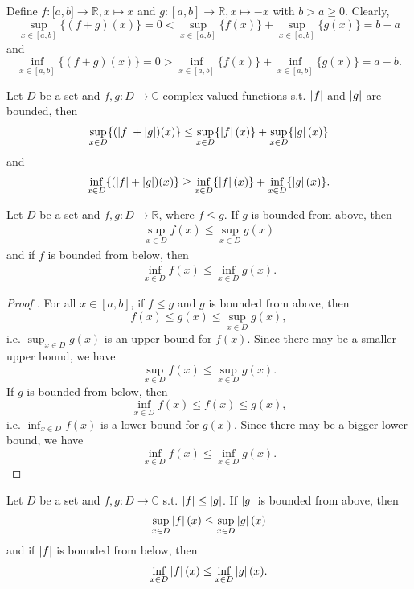 \begin{exmp}
	Define $f: \mathbb [a, b]\to\mathbb R, x\mapsto x$ and $g: [a, b]\to\mathbb R, x\mapsto -x$ with $b > a\geq 0$. Clearly, $$\sup_{x\in [a, b]}\{(f+g)(x)\} = 0 < \sup_{x\in [a, b]}\{f(x)\} + \sup_{x\in [a, b]}\{g(x)\} = b - a$$ and $$\inf_{x\in [a, b]}\{(f + g)(x)\} = 0 > \inf_{x\in [a, b]}\{f(x)\} + \inf_{x\in [a, b]}\{g(x)\} = a - b.$$
\end{exmp}

\begin{corollary}
	Let $D$ be a set and $f, g: D\to \mathbb C$ complex-valued functions s.t. $\left\vert f \right\vert$ and $\left\vert g \right\vert$ are bounded, then 
	\begin{align}
		\sup_{x\in D}\{(\left\vert f \right\vert + \left\vert g \right\vert)(x)\} \leq \sup_{x\in D}\{\left\vert f \right\vert(x)\} + \sup_{x\in D}\{\left\vert g \right\vert(x)\}
	\end{align}
	and
	\begin{align}
		\inf_{x\in D}\{(\left\vert f \right\vert+\left\vert g \right\vert)(x)\} \geq \inf_{x\in D}\{\left\vert f \right\vert(x)\} + \inf_{x\in D}\{\left\vert g \right\vert(x)\}.
	\end{align}
\end{corollary}

\begin{theorem}\label{thrm:sup_inequality_2}
	Let $D$ be a set and $f, g: D\to\mathbb R$, where $f \leq g$. If $g$ is bounded from above, then 
	\begin{align}\label{eq:sup_inequality_2}
		\sup_{x\in D}f(x)\leq \sup_{x\in D}g(x)
	\end{align}
	and if $f$ is bounded from below, then 
	\begin{align}
		\inf_{x\in D}f(x) \leq \inf_{x\in D}g(x).
	\end{align}
\end{theorem}

\begin{proof}[Proof \cite{src:supremum_and_infimum}]
	For all $x\in[a, b]$, if $f\leq g$ and $g$ is bounded from above, then
	$$f(x)\leq g(x)\leq \sup_{x\in D}g(x),$$
	i.e. $\sup_{x\in D}g(x)$ is an upper bound for $f(x)$. Since there may be a smaller upper bound, we have
	$$\sup_{x\in D}f(x) \leq \sup_{x\in D}g(x).$$
	If $g$ is bounded from below, then 
	$$\inf_{x\in D}f(x) \leq f(x) \leq g(x),$$
	i.e. $\inf_{x\in D}f(x)$ is a lower bound for $g(x)$. Since there may be a bigger lower bound, we have
	$$\inf_{x\in D}f(x)\leq \inf_{x\in D}g(x).$$	
\end{proof}

\begin{corollary}
	Let $D$ be a set and $f, g: D\to\mathbb C$ s.t. $\left\vert f \right\vert\leq\left\vert g \right\vert$. If $\left\vert g \right\vert$ is bounded from above, then 
	\begin{align}
		\sup_{x\in D}\left\vert f \right\vert(x) \leq \sup_{x\in D}\left\vert g \right\vert(x)
	\end{align}
	and if $\left\vert f \right\vert$ is bounded from below, then 
	\begin{align}
		\inf_{x\in D}\left\vert f \right\vert(x) \leq \inf_{x\in D}\left\vert g \right\vert(x).
	\end{align}
\end{corollary}